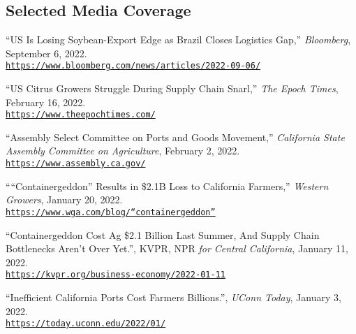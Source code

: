 \documentclass[10.5 pt,letterpaper]{article}
\renewenvironment{itemize}{
	\begin{list}{}{
			\setlength{\leftmargin}{1.5em}
		}
	}{
	\end{list}
}
\begin{document}
 \subsection*{\textbf{Selected Media Coverage}}
 
\begin{itemize}
	
		
\item[-] ``US Is Losing Soybean-Export Edge as Brazil Closes Logistics Gap,'' \textit{Bloomberg}, September 6, 2022.     \\	\href{https://www.bloomberg.com/news/articles/2022-09-06/us-losing-soybean-export-edge-as-brazil-closes-logistics-gap?leadSource=uverify%20wall}{\texttt{https://www.bloomberg.com/news/articles/2022-09-06/}}



	\item[-] ``US Citrus Growers Struggle During Supply Chain Snarl,'' \textit{The Epoch Times}, February 16, 2022.     \\	\href{https://www.theepochtimes.com/u-s-citrus-growers-struggle-during-supply-chain-snarl_4283693.html}{\texttt{https://www.theepochtimes.com/}}
	
	
	
	
	\item[-] ``Assembly Select Committee on Ports and Goods Movement,'' \textit{California State Assembly	Committee on Agriculture}, February 2, 2022.     \\	\href{https://www.assembly.ca.gov/sites/assembly.ca.gov/files/ag_export_briefing_document_final.pdf}{\texttt{https://www.assembly.ca.gov/}}
	
	
	
	\item[-] ````Containergeddon'' Results in \$2.1B Loss to California Farmers,'' \textit{Western Growers}, January 20, 2022.     \\	\href{https://www.wga.com/blog/“containergeddon”-results-21b-loss-california-farmers}{\texttt{https://www.wga.com/blog/“containergeddon”}}
	
	
	\item[-] ``Containergeddon Cost Ag \$2.1 Billion Last Summer, And Supply Chain Bottlenecks Aren’t Over Yet.'', KVPR, NPR \textit{for Central California}, January 11, 2022.     \\  
	\href{https://kvpr.org/business-economy/2022-01-11/containergeddon-cost-ag-2- 1-billion-last-summer-and-supply-chain-bottlenecks-arent-over-yet}{\texttt{https://kvpr.org/business-economy/2022-01-11}}
	
	
	
	
		
	\item[-] ``Inefficient California Ports Cost Farmers Billions.'', \textit{UConn Today}, January 3, 2022.     \\	\href{https://today.uconn.edu/2022/01/inefficient-california-ports-cost-farmers-billions/}{\texttt{https://today.uconn.edu/2022/01/}}
	
	
	
	

	
	
\end{itemize}
 
\end{document}
